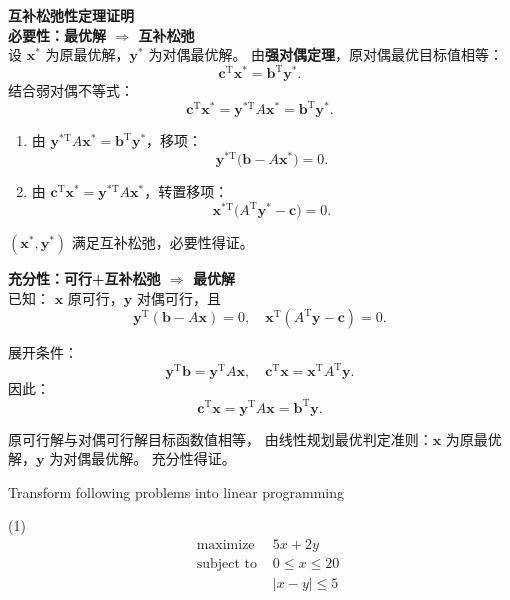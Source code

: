 \documentclass{article}
\newcounter{exercise}
\newcommand{\<}{
    \langle}
\renewcommand{\>}{
    \rangle}
\begin{document}
{\noindent\textbf{互补松弛性定理证明}\\
\textbf{必要性：最优解 $\Rightarrow$ 互补松弛}\\
设 $\boldsymbol{x}^*$ 为原最优解，$\boldsymbol{y}^*$ 为对偶最优解。
由\textbf{强对偶定理}，原对偶最优目标值相等：
\[
\boldsymbol{c}^\mathrm{T}\boldsymbol{x}^*
= \boldsymbol{b}^\mathrm{T}\boldsymbol{y}^*.
\]
结合弱对偶不等式：
\[
\boldsymbol{c}^\mathrm{T}\boldsymbol{x}^*
=\boldsymbol{y}^{*\mathrm{T}}A\boldsymbol{x}^*
=\boldsymbol{b}^\mathrm{T}\boldsymbol{y}^*.
\]

\begin{enumerate}
\item 由 $\boldsymbol{y}^{*\mathrm{T}}A\boldsymbol{x}^* = \boldsymbol{b}^\mathrm{T}\boldsymbol{y}^*$，移项：
\[
\boldsymbol{y}^{*\mathrm{T}}\big(\boldsymbol{b}-A\boldsymbol{x}^*\big)=0.
\]
\item 由 $\boldsymbol{c}^\mathrm{T}\boldsymbol{x}^* = \boldsymbol{y}^{*\mathrm{T}}A\boldsymbol{x}^*$，转置移项：
\[
\boldsymbol{x}^{*\mathrm{T}}\big(A^\mathrm{T}\boldsymbol{y}^*-\boldsymbol{c}\big)=0.
\]
\end{enumerate}
$(\boldsymbol{x}^*,\boldsymbol{y}^*)$ 满足互补松弛，必要性得证。

\noindent\textbf{充分性：可行+互补松弛 $\Rightarrow$ 最优解}\\
已知：
$\boldsymbol{x}$ 原可行，$\boldsymbol{y}$ 对偶可行，且
\[
\boldsymbol{y}^\mathrm{T}(\boldsymbol{b}-A\boldsymbol{x})=0,\quad
\boldsymbol{x}^\mathrm{T}(A^\mathrm{T}\boldsymbol{y}-\boldsymbol{c})=0.
\]

展开条件：
\[
\boldsymbol{y}^\mathrm{T}\boldsymbol{b} = \boldsymbol{y}^\mathrm{T}A\boldsymbol{x},\quad
\boldsymbol{c}^\mathrm{T}\boldsymbol{x} = \boldsymbol{x}^\mathrm{T}A^\mathrm{T}\boldsymbol{y}.
\]
因此：
\[
\boldsymbol{c}^\mathrm{T}\boldsymbol{x}
=\boldsymbol{y}^\mathrm{T}A\boldsymbol{x}
=\boldsymbol{b}^\mathrm{T}\boldsymbol{y}.
\]

原可行解与对偶可行解目标函数值相等，
由线性规划最优判定准则：$\boldsymbol{x}$ 为原最优解，$\boldsymbol{y}$ 为对偶最优解。
充分性得证。


\begin{exercise}
	Transform following problems into linear programming
	
	(1)
		$$\begin{aligned}
		&\text { maximize } & 5x+2y\\
		&\text { subject to } & 0 \le x \le 20 \\
		& & |x - y|\le 5
		\end{aligned}$$
		

\end{exercise}}
\end{document}
